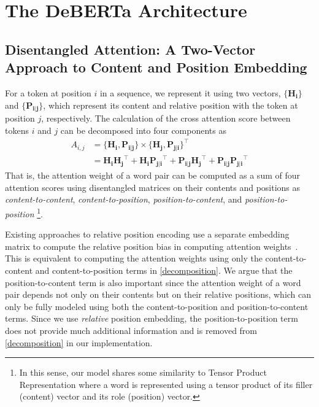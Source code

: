 \section{The DeBERTa Architecture}
\subsection{Disentangled Attention: A Two-Vector Approach to Content and Position Embedding}
For a token at position $i$ in a sequence, we represent it using two vectors, $\{\bm{H_i}\}$ and $\{\bm{P_{i|j}}\}$, 
which represent its content and relative position with the token at position $j$, respectively.
The calculation of the cross attention score between tokens $i$ and $j$ can be decomposed into four components as
\begin{equation}\label{decomposition}
\begin{split}
A_{i,j} & = \{\bm{H_i},\bm{P_{i|j}}\} \times \{\bm{H_j}, \bm{P_{j|i}}\}^{\intercal} \\
        & = \bm{H_i}\bm{H_j}^{\intercal} + \bm{H_i}\bm{P_{j|i}}^{\intercal} 
        + \bm{P_{i|j}}\bm{H_j}^{\intercal} + \bm{P_{i|j}}\bm{P_{j|i}}^{\intercal}
\end{split}
\end{equation}
That is, the attention weight of a word pair can be computed as a sum of four attention scores using disentangled matrices on their contents and positions as  
\textit{content-to-content}, \textit{content-to-position}, \textit{position-to-content}, and \textit{position-to-position}
\footnote{In this sense, our model shares some similarity to Tensor Product Representation \citep{smolensky1990ptr,schlag2019enhancing,chen2019natural} where a word is represented using a tensor product of its filler (content) vector and its role (position) vector.}. 


Existing approaches to relative position encoding use a separate embedding matrix to compute the relative position bias in computing attention weights~\citep{shaw2018self, huang2018music}. 
This is equivalent to computing the attention weights using only the  content-to-content and content-to-position terms in \eqref{decomposition}.
We argue that the position-to-content term is also important since the attention weight of a word pair depends not only on their contents but on their relative positions, which can only be fully modeled using both the content-to-position and position-to-content terms.
Since we use \emph{relative} position embedding, the position-to-position term does not provide much additional information and is removed from \eqref{decomposition} in our implementation.

